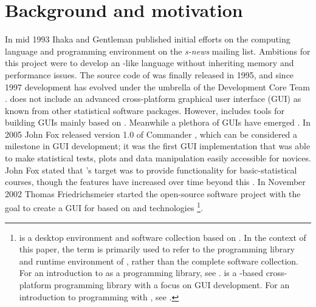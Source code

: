 \section{Background and motivation}
\label{background}
In mid 1993 Ihaka and Gentleman published initial efforts on the computing
language and programming environment  on the \emph{s-news} mailing list. Ambitions for
this project were to develop an -like language without inheriting memory
and performance issues. The source code of  was finally released in 1995, and 
since 1997 development has evolved under the umbrella of the  
Development Core Team \citep{RDCT2001, RMAIN, Ihaka_Gentlemen_1993}.
 does not include an advanced cross-platform graphical user interface (GUI) as known from other
statistical software packages. However,  includes tools for building GUIs
mainly based on  \citep{Dalgaard2001, Dalgaard2002}. Meanwhile a
plethora of  GUIs have emerged \citep[see][for a comprehensive list]{RGUI}. In 2005 John Fox released version 1.0 of  Commander \citep[package ]{Fox2005}, which
can be considered a milestone in  GUI development; it was the first GUI
implementation that was able to make statistical tests,
plots and data manipulation easily accessible for  novices.
John Fox stated that 's target was to provide
functionality for basic-statistical courses, though the features have increased over
time beyond this \citep{Fox2005, Fox2007}. In November 2002 Thomas Friedrichsmeier
started the  open-source software project with the goal to create a GUI for
 based on  \citep{KDEmain} and  \citep{QTmain} technologies
\footnote{
   is a desktop environment and software collection based on .
  In the context of this paper, the term  is primarily used to refer to the programming library and
  runtime environment of , rather than the complete software collection. For an introduction to
   as a programming library, see \cite{Faure2000}.  is a -based cross-platform programming library with a focus on GUI development. For an
  introduction to programming with , see \cite{BlanchetteSummerfield2008}.
}.

